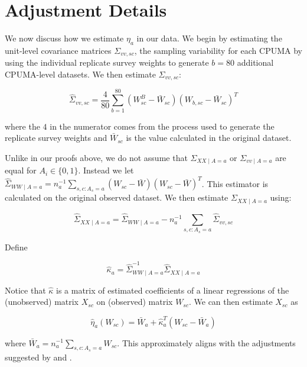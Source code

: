 \section{Adjustment Details}

We now discuss how we estimate $\eta_a$ in our data. We begin by estimating the unit-level covariance matrices $\Sigma_{vv, sc}$, the sampling variability for each CPUMA by using the individual replicate survey weights to generate $b = 80$ additional CPUMA-level datasets. We then estimate $\Sigma_{vv, sc}$:

\begin{equation}
\hat{\Sigma}_{vv, sc} = \frac{4}{80}\sum_{b=1}^{80}(W_{sc}^B - \bar{W}_{sc})(W_{b, sc} - \bar{W}_{sc})^T
\end{equation}

where the $4$ in the numerator comes from the process used to generate the replicate survey weights and $\bar{W}_{sc}$ is the value calculated in the original dataset. 

Unlike in our proofs above, we do not assume that $\Sigma_{XX \mid A = a}$ or $\Sigma_{vv \mid A = a}$ are equal for $A_i \in \{0, 1\}$. Instead we let $\hat{\Sigma}_{WW \mid A = a} = n_a^{-1}\sum_{s, c: A_s = a} (W_{sc} - \bar{W})(W_{sc} - \bar{W})^T$. This estimator is calculated on the original observed dataset. We then estimate $\Sigma_{XX \mid A = a}$ using:

\begin{equation}
\hat{\Sigma}_{XX \mid A = a} = \hat{\Sigma}_{WW \mid A = a} - n_a^{-1}\sum_{s, c: A_s = a} \hat{\Sigma}_{vv, sc}
\end{equation}

Define

\begin{equation}
\hat{\kappa}_a = \hat{\Sigma}_{WW \mid A = a}^{-1}\hat{\Sigma}_{XX \mid A = a}
\end{equation}

Notice that $\hat{\kappa}$ is a matrix of estimated coefficients of a linear regressions of the (unobserved) matrix $X_{sc}$ on (observed) matrix $W_{sc}$. We can then estimate $X_{sc}$ as

\begin{equation}
\hat{\eta}_a(W_{sc}) = \bar{W}_a + \hat{\kappa}_a^T(W_{sc} - \bar{W}_a)
\end{equation}

where $\bar{W}_a = n_a^{-1}\sum_{s, c: A_s = a} W_{sc}$. This approximately aligns with the adjustments suggested by \cite{carroll2006measurement} and \cite{gleser1992importance}. 


